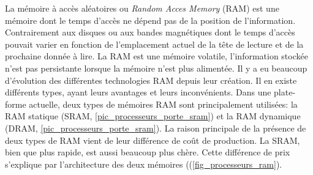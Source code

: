La mémoire à accès aléatoires ou \textit{Random Acces Memory} (RAM) est une mémoire dont le temps d'accès ne dépend pas de la position de l'information. Contrairement aux disques ou aux bandes magnétiques dont le temps d'accès pouvait varier en fonction de l'emplacement actuel de la tête de lecture et de la prochaine donnée à lire. La RAM est une mémoire volatile, l'information stockée n'est pas persistante lorsque la mémoire n'est plus alimentée. Il y a eu beaucoup d'évolution des différentes technologies RAM depuis leur création. Il en existe différents types, ayant leurs avantages et leurs inconvénients. Dans une plate-forme actuelle, deux types de mémoires RAM sont principalement utilisées: la RAM statique (SRAM, \autoref{pic_processeurs_porte_sram}) et la RAM dynamique (DRAM, \autoref{pic_processeurs_porte_sram}). La raison principale de la présence de deux types de RAM vient de leur différence de coût de production. La SRAM, bien que plus rapide, est aussi beaucoup plus chère. Cette différence de prix s'explique par l'architecture des deux mémoires ((\autoref{fig_processeurs_ram}).


